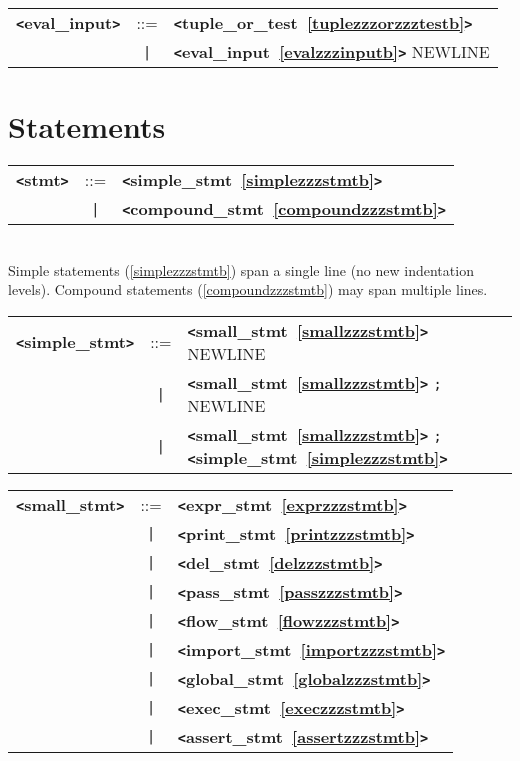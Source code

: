 \documentclass[12pt]{article}
\begin{document}
\begin{tabular}{lcl}
{\bf \verb+<+eval\_input\verb+>+} & ::=  & {\bf \verb+<+tuple\_or\_test~\ref{tuplezzzorzzztestb}\verb+>+}  \\
 & \verb+|+  & {\bf \verb+<+eval\_input~\ref{evalzzzinputb}\verb+>+}  NEWLINE \\
\end{tabular}

\section{Statements}

\label{stmtb}
\begin{tabular}{lcl}
{\bf \verb+<+stmt\verb+>+} & ::=  & {\bf \verb+<+simple\_stmt~\ref{simplezzzstmtb}\verb+>+}  \\
 & \verb+|+  & {\bf \verb+<+compound\_stmt~\ref{compoundzzzstmtb}\verb+>+}  \\
\end{tabular} \\

Simple statements (\ref{simplezzzstmtb}) span a single line (no new indentation levels).  Compound statements (\ref{compoundzzzstmtb}) may span multiple lines. \\

\label{simplezzzstmtb}
\begin{tabular}{lcl}
{\bf \verb+<+simple\_stmt\verb+>+} & ::=  & {\bf \verb+<+small\_stmt~\ref{smallzzzstmtb}\verb+>+}  NEWLINE \\
 & \verb+|+  & {\bf \verb+<+small\_stmt~\ref{smallzzzstmtb}\verb+>+}  \verb|;| NEWLINE \\
 & \verb+|+  & {\bf \verb+<+small\_stmt~\ref{smallzzzstmtb}\verb+>+}  \verb|;| {\bf \verb+<+simple\_stmt~\ref{simplezzzstmtb}\verb+>+}  \\
\end{tabular}

\label{smallzzzstmtb}
\begin{tabular}{lcl}
{\bf \verb+<+small\_stmt\verb+>+} & ::=  & {\bf \verb+<+expr\_stmt~\ref{exprzzzstmtb}\verb+>+}  \\
 & \verb+|+  & {\bf \verb+<+print\_stmt~\ref{printzzzstmtb}\verb+>+}  \\
 & \verb+|+  & {\bf \verb+<+del\_stmt~\ref{delzzzstmtb}\verb+>+}  \\
 & \verb+|+  & {\bf \verb+<+pass\_stmt~\ref{passzzzstmtb}\verb+>+}  \\
 & \verb+|+  & {\bf \verb+<+flow\_stmt~\ref{flowzzzstmtb}\verb+>+}  \\
 & \verb+|+  & {\bf \verb+<+import\_stmt~\ref{importzzzstmtb}\verb+>+}  \\
 & \verb+|+  & {\bf \verb+<+global\_stmt~\ref{globalzzzstmtb}\verb+>+}  \\
 & \verb+|+  & {\bf \verb+<+exec\_stmt~\ref{execzzzstmtb}\verb+>+}  \\
 & \verb+|+  & {\bf \verb+<+assert\_stmt~\ref{assertzzzstmtb}\verb+>+}  \\
\end{tabular}
\end{document}
